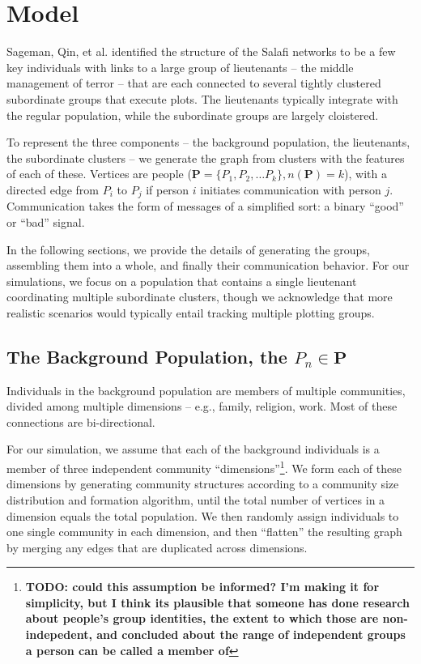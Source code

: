 \documentclass{article}
\begin{document}
\section*{Model}
Sageman, Qin, et al. identified the structure of the Salafi networks to be a few key individuals with links to a large group of lieutenants -- the middle management of terror -- that are each connected to several tightly clustered subordinate groups that execute plots.  The lieutenants typically integrate with the regular population, while the subordinate groups are largely cloistered.

To represent the three components -- the background population, the lieutenants, the subordinate clusters -- we generate the graph from clusters with the features of each of these.  Vertices are people ($\mathbf{P}=\{P_1, P_2, \ldots P_k\}, n(\mathbf{P})=k$), with a directed edge from $P_i$ to $P_j$ if person $i$ initiates communication with person $j$.  Communication takes the form of messages of a simplified sort: a binary ``good'' or ``bad'' signal.

In the following sections, we provide the details of generating the groups, assembling them into a whole, and finally their communication behavior.  For our simulations, we focus on a population that contains a single lieutenant coordinating multiple subordinate clusters, though we acknowledge that more realistic scenarios would typically entail tracking multiple plotting groups.

\subsection*{The Background Population, the $P_{n}\in\mathbf{P}$}
Individuals in the background population are members of multiple communities, divided among multiple dimensions -- e.g., family, religion, work.  Most of these connections are bi-directional.

For our simulation, we assume that each of the background individuals is a member of three independent community ``dimensions''\footnote{{\bf TODO: could this assumption be informed? I'm making it for simplicity, but I think its plausible that someone has done research about people's group identities, the extent to which those are non-indepedent, and concluded about the range of independent groups a person can be called a member of}}.  We form each of these dimensions by generating community structures according to a community size distribution and formation algorithm, until the total number of vertices in a dimension equals the total population.  We then randomly assign individuals to one single community in each dimension, and then ``flatten'' the resulting graph by merging any edges that are duplicated across dimensions.
\end{document}
